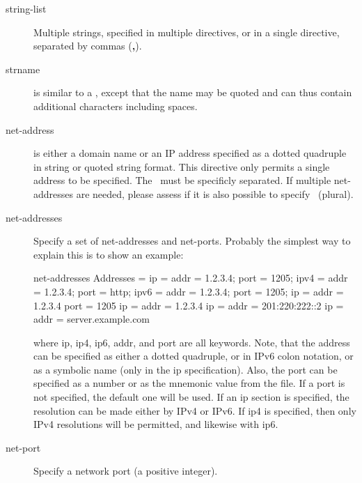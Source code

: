 \begin{description}
\item [string-list]
    \label{DataTypeStringList}
    Multiple strings, specified in multiple directives, or in a single directive, separated by commas (\textbf{,}).

\item [strname]
    \label{DataTypeStrname}
is similar to a \dtName, except that the name may be quoted and
can thus contain  additional characters including spaces.


\item [net-address]
    \label{DataTypeNetAddress}
is either a domain name or an IP address specified as a
dotted quadruple in string or quoted string format.
This directive only permits a single address to be specified.
The \dtNetPort\ must be specificly separated.
If multiple net-addresses are needed, please assess if it is also possible to specify \dtNetAddresses\ (plural).


\item [net-addresses]
    \label{DataTypeNetAddresses}
Specify a set of net-addresses and net-ports.
Probably the simplest way to explain
this is to show an example:

\begin{bconfig}{net-addresses}
Addresses  = {
    ip = { addr = 1.2.3.4; port = 1205;}
    ipv4 = {
        addr = 1.2.3.4; port = http;}
    ipv6 = {
        addr = 1.2.3.4;
        port = 1205;
    }
    ip = {
        addr = 1.2.3.4
        port = 1205
    }
    ip = { addr = 1.2.3.4 }
    ip = { addr = 201:220:222::2 }
    ip = {
        addr = server.example.com
    }
}
\end{bconfig}

where ip, ip4, ip6, addr, and port are all keywords. Note, that  the address
can be specified as either a dotted quadruple, or  in IPv6 colon notation, or as
a symbolic name (only in the ip specification).  Also, the port can be specified
as a number or as the mnemonic value from  the  file.  If a port
is not specified, the default one will be used. If an ip  section is specified,
the resolution can be made either by IPv4 or  IPv6. If ip4 is specified, then
only IPv4 resolutions will be permitted,  and likewise with ip6.


\item [net-port]
    \label{DataTypeNetPort}
    Specify a network port (a positive  integer).


\end{description}

